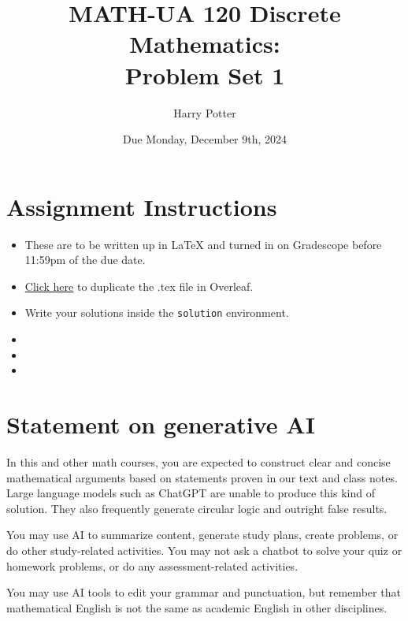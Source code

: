 \documentclass{article}
\title{MATH-UA 120 Discrete Mathematics: \\ Problem Set 1}
\author{%
    Harry Potter %
}
\date{Due Monday, December 9th, 2024}
\theoremstyle{definition}
\begin{document}
\maketitle %


\section*{Assignment Instructions}

\begin{itemize}
    \item These are to be written up in \LaTeX{} and turned in on Gradescope before 11:59pm of the due date.
    \item \href{https://www.google.com}{Click here} to duplicate the .tex file in Overleaf.
    \item Write your solutions inside the \texttt{solution} environment.
    \item 
    \item 
    \item 
\end{itemize}

\vfill

\section*{Statement on generative AI}

In this and other math courses, you are expected to construct clear and concise mathematical arguments based on statements proven in our text and class notes. Large language models such as ChatGPT are unable to produce this kind of solution. They also frequently generate circular logic and outright false results.
 
You may use AI to summarize content, generate study plans, create problems, or do other study-related activities. You may not ask a chatbot to solve your quiz or homework problems, or do any assessment-related activities.
 
You may use AI tools to edit your grammar and punctuation, but remember that mathematical English is not the same as academic English in other disciplines. 

\vfill

\newpage

\end{document}
